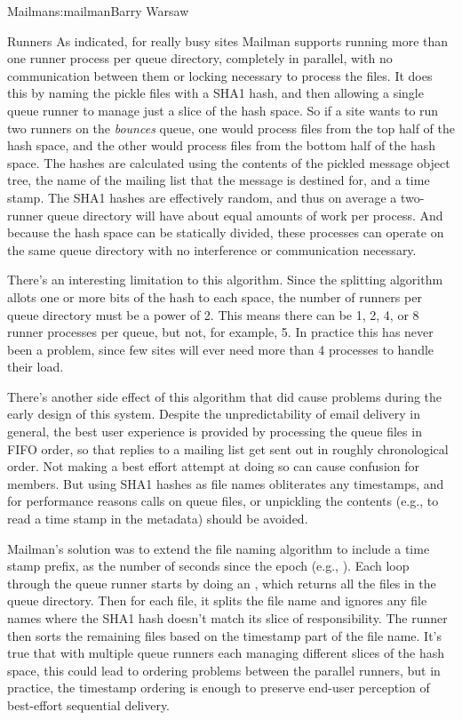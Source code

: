 \begin{aosachapter}{Mailman}{s:mailman}{Barry Warsaw}
\begin{aosasect1}{Runners}
As indicated, for really busy sites Mailman supports running more
than one runner process per queue directory, completely in parallel,
with no communication between them or locking necessary to process the
files.  It does this by naming the pickle files with a SHA1 hash, and
then allowing a single queue runner to manage just a slice of the hash
space.  So if a site wants to run two runners on the \emph{bounces}
queue, one would process files from the top half of the hash space,
and the other would process files from the bottom half of the hash
space.  The hashes are calculated using the contents of the pickled
message object tree, the name of the mailing list that the message is
destined for, and a time stamp.  The SHA1 hashes are effectively
random, and thus on average a two-runner queue directory will have
about equal amounts of work per process.  And because the hash space
can be statically divided, these processes can operate on the same
queue directory with no interference or communication necessary.

There's an interesting limitation to this algorithm.  Since the
splitting algorithm allots one or more bits of the hash to each space,
the number of runners per queue directory must be a power of 2.  This
means there can be 1, 2, 4, or 8 runner processes per queue, but not,
for example, 5.  In practice this has never been a problem, since few
sites will ever need more than 4 processes to handle their load.

There's another side effect of this algorithm that did cause problems
during the early design of this system.  Despite the unpredictability
of email delivery in general, the best user experience is provided by
processing the queue files in FIFO order, so that replies to a mailing
list get sent out in roughly chronological order.  Not making a best
effort attempt at doing so can cause confusion for members.  But using
SHA1 hashes as file names obliterates any timestamps, and for
performance reasons  calls on queue files, or unpickling
the contents (e.g., to read a time stamp in the metadata) should be
avoided.

Mailman's solution was to extend the file naming algorithm to include
a time stamp prefix, as the number of seconds since the epoch (e.g.,
).  Each loop through the queue
runner starts by doing an , which returns all the
files in the queue directory. Then for each file, it splits the file
name and ignores any file names where the SHA1 hash doesn't match its
slice of responsibility.  The runner then sorts the remaining files
based on the timestamp part of the file name.  It's true that with
multiple queue runners each managing different slices of the hash
space, this could lead to ordering problems between the parallel
runners, but in practice, the timestamp ordering is enough to preserve
end-user perception of best-effort sequential delivery.


\end{aosasect1}
\end{aosachapter}
